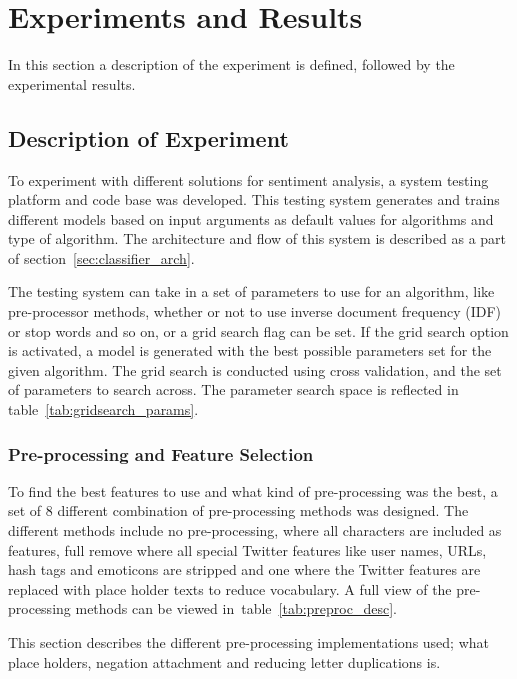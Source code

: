 \chapter{Experiments and Results}

In this section a description of the experiment is defined, followed by the experimental results. 

\section{Description of Experiment}

To experiment with different solutions for sentiment analysis, a system testing platform and code base was developed. This testing system generates and trains different models based on input arguments as default values for algorithms and type of algorithm. The architecture and flow of this system is described as a part of section~\ref{sec:classifier_arch}.

The testing system can take in a set of parameters to use for an algorithm, like pre-processor methods, whether or not to use inverse document frequency (IDF) or stop words and so on, or a grid search flag can be set. If the grid search option is activated, a model is generated with the best possible parameters set for the given algorithm. The grid search is conducted using cross validation, and the set of parameters to search across. The parameter search space is reflected in table~\ref{tab:gridsearch_params}.


\subsection{Pre-processing and Feature Selection}

To find the best features to use and what kind of pre-processing was the best, a set of 8 different combination of pre-processing methods was designed. The different methods include no pre-processing, where all characters are included as features, full remove where all special Twitter features like user names, URLs, hash tags and emoticons are stripped and one where the Twitter features are replaced with place holder texts to reduce vocabulary. A full view of the pre-processing methods can be viewed in~table~\ref{tab:preproc_desc}.

This section describes the different pre-processing implementations used; what place holders, negation attachment and reducing letter duplications is.

